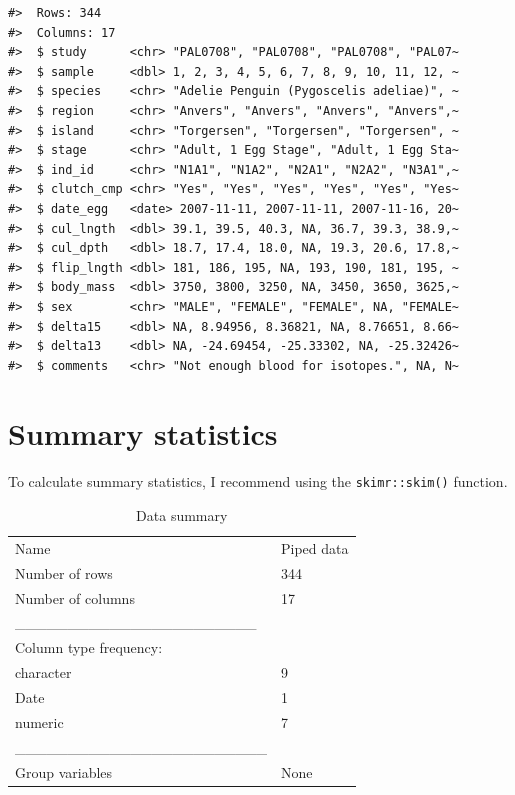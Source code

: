 \documentclass[letterpaper,9pt,twoside,]{pinp}
\begin{document}
\begin{ShadedResult}
\begin{verbatim}
#>  Rows: 344
#>  Columns: 17
#>  $ study      <chr> "PAL0708", "PAL0708", "PAL0708", "PAL07~
#>  $ sample     <dbl> 1, 2, 3, 4, 5, 6, 7, 8, 9, 10, 11, 12, ~
#>  $ species    <chr> "Adelie Penguin (Pygoscelis adeliae)", ~
#>  $ region     <chr> "Anvers", "Anvers", "Anvers", "Anvers",~
#>  $ island     <chr> "Torgersen", "Torgersen", "Torgersen", ~
#>  $ stage      <chr> "Adult, 1 Egg Stage", "Adult, 1 Egg Sta~
#>  $ ind_id     <chr> "N1A1", "N1A2", "N2A1", "N2A2", "N3A1",~
#>  $ clutch_cmp <chr> "Yes", "Yes", "Yes", "Yes", "Yes", "Yes~
#>  $ date_egg   <date> 2007-11-11, 2007-11-11, 2007-11-16, 20~
#>  $ cul_lngth  <dbl> 39.1, 39.5, 40.3, NA, 36.7, 39.3, 38.9,~
#>  $ cul_dpth   <dbl> 18.7, 17.4, 18.0, NA, 19.3, 20.6, 17.8,~
#>  $ flip_lngth <dbl> 181, 186, 195, NA, 193, 190, 181, 195, ~
#>  $ body_mass  <dbl> 3750, 3800, 3250, NA, 3450, 3650, 3625,~
#>  $ sex        <chr> "MALE", "FEMALE", "FEMALE", NA, "FEMALE~
#>  $ delta15    <dbl> NA, 8.94956, 8.36821, NA, 8.76651, 8.66~
#>  $ delta13    <dbl> NA, -24.69454, -25.33302, NA, -25.32426~
#>  $ comments   <chr> "Not enough blood for isotopes.", NA, N~
\end{verbatim}
\end{ShadedResult}

\hypertarget{summary-statistics}{%
\section{Summary statistics}\label{summary-statistics}}

To calculate summary statistics, I recommend using the
\texttt{skimr::skim()} function.

\begin{Shaded}
\begin{Highlighting}[]
\SpecialCharTok{\%\textgreater{}\%} 
  \NormalTok{()}
\end{Highlighting}
\end{Shaded}

\begin{longtable}[]{@{}ll@{}}
\caption{Data summary}\tabularnewline
\toprule
\endhead
Name & Piped data \\
Number of rows & 344 \\
Number of columns & 17 \\
\_\_\_\_\_\_\_\_\_\_\_\_\_\_\_\_\_\_\_\_\_\_\_ & \\
Column type frequency: & \\
character & 9 \\
Date & 1 \\
numeric & 7 \\
\_\_\_\_\_\_\_\_\_\_\_\_\_\_\_\_\_\_\_\_\_\_\_\_ & \\
Group variables & None \\
\bottomrule
\end{longtable}
\end{document}
